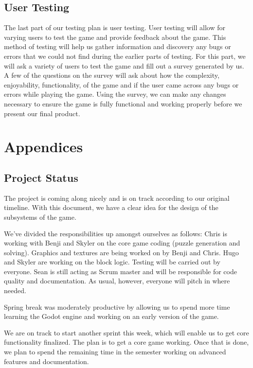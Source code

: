\documentclass[12pt]{article}
\begin{document}
\subsection{User Testing}
The last part of our testing plan is user testing. User testing will allow for varying users to test the game and provide feedback about the game. This method of testing will help us gather information and discovery any bugs or errors that we could not find during the earlier parts of testing. For this part, we will ask a variety of users to test the game and fill out a survey generated by us. A few of the questions on the survey will ask about how the complexity, enjoyability, functionality, of the game and if the user came across any bugs or errors while playing the game. Using the survey, we can make any changes necessary to ensure the game is fully functional and working properly before we present our final product.
\section{Appendices}
\subsection{Project Status}
The project is coming along nicely and is on track according to our original timeline. With this document, we have a clear idea for the design of the subsystems of the game.

We've divided the responsibilities up amongst ourselves as follows: Chris is working with Benji and Skyler on the core game coding (puzzle generation and solving). Graphics and textures are being worked on by Benji and Chris. Hugo and Skyler are working on the block logic. Testing will be carried out by everyone. Sean is still acting as Scrum master and will be responsible for code quality and documentation. As usual, however, everyone will pitch in where needed.

Spring break was moderately productive by allowing us to spend more time learning the Godot engine and working on an early version of the game.

We are on track to start another sprint this week, which will enable us to get core functionality finalized. The plan is to get a core game working. Once that is done, we plan to spend the remaining time in the semester working on advanced features and documentation.



\end{document}
